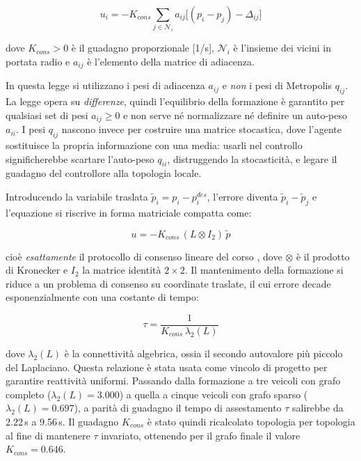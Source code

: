\documentclass[conference,9pt]{IEEEtran}
\begin{document}
\begin{equation}
u_i = -K_{cons} \sum_{j \in \mathcal{N}_i} a_{ij} \Big[(p_i - p_j) - \Delta_{ij}\Big]
\label{eq:consenso}
\end{equation}

dove $K_{cons} > 0$ \`e il guadagno proporzionale [1/s], $\mathcal{N}_i$ \`e
l'insieme dei vicini in portata radio e $a_{ij}$ \`e l'elemento della matrice
di adiacenza.

In questa legge si utilizzano i pesi di adiacenza $a_{ij}$ e \emph{non} i pesi
di Metropolis $q_{ij}$. La legge opera su \emph{differenze}, quindi l'equilibrio
della formazione \`e garantito per qualsiasi set di pesi $a_{ij} \ge 0$ e non
serve n\'e normalizzare n\'e definire un auto-peso $a_{ii}$. I pesi $q_{ij}$
nascono invece per costruire una matrice stocastica, dove l'agente sostituisce
la propria informazione con una media: usarli nel controllo significherebbe
scartare l'auto-peso $q_{ii}$, distruggendo la stocasticit\`a, e legare il
guadagno del controllore alla topologia locale.

Introducendo la variabile traslata $\tilde p_i = p_i - p_i^{des}$, l'errore
diventa $\tilde p_i - \tilde p_j$ e l'equazione si riscrive in forma matriciale
compatta come:

\begin{equation}
u = -K_{cons}\,(L \otimes I_2)\,\tilde p
\label{eq:consenso_matriciale}
\end{equation}

cio\`e \emph{esattamente} il protocollo di consenso lineare del corso
\cite{fontanelli_notes}, dove $\otimes$ \`e il prodotto di Kronecker e $I_2$ la
matrice identit\`a $2\times 2$. Il mantenimento della formazione si riduce a un
problema di consenso su coordinate traslate, il cui errore decade
esponenzialmente con una costante di tempo:

\begin{equation}
\tau = \frac{1}{K_{cons}\,\lambda_2(L)}
\label{eq:tau}
\end{equation}

dove $\lambda_2(L)$ \`e la connettivit\`a algebrica, ossia il secondo autovalore
pi\`u piccolo del Laplaciano. Questa relazione \`e stata usata come vincolo di
progetto per garantire reattivit\`a uniformi. Passando dalla formazione a tre
veicoli con grafo completo ($\lambda_2(L) = 3.000$) a quella a cinque veicoli
con grafo sparso ($\lambda_2(L) = 0.697$), a parit\`a di guadagno il tempo di
assestamento $\tau$ salirebbe da 2.22\,s a 9.56\,s. Il guadagno $K_{cons}$ \`e
stato quindi ricalcolato topologia per topologia al fine di mantenere $\tau$
invariato, ottenendo per il grafo finale il valore $K_{cons} = 0.646$.
\end{document}

